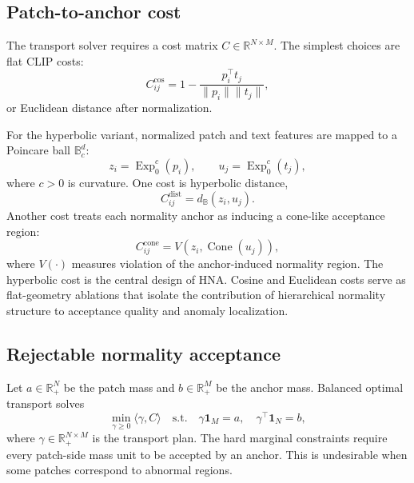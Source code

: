 \documentclass[10pt]{article}
\newcommand{\method}{HNA}
\begin{document}
\subsection{Patch-to-anchor cost}

The transport solver requires a cost matrix $C \in \mathbb{R}^{N \times M}$.
The simplest choices are flat CLIP costs:
\begin{equation}
    C_{ij}^{\mathrm{cos}} = 1 - \frac{p_i^{\top}t_j}{\|p_i\|\|t_j\|},
\end{equation}
or Euclidean distance after normalization.

For the hyperbolic variant, normalized patch and text features are mapped to a Poincare ball $\mathbb{B}^{d}_{c}$:
\begin{equation}
    z_i = \operatorname{Exp}^{c}_{0}(p_i), \qquad
    u_j = \operatorname{Exp}^{c}_{0}(t_j),
\end{equation}
where $c>0$ is curvature.
One cost is hyperbolic distance,
\begin{equation}
    C_{ij}^{\mathrm{dist}} = d_{\mathbb{B}}(z_i, u_j).
\end{equation}
Another cost treats each normality anchor as inducing a cone-like acceptance region:
\begin{equation}
    C_{ij}^{\mathrm{cone}} = V(z_i, \operatorname{Cone}(u_j)),
\end{equation}
where $V(\cdot)$ measures violation of the anchor-induced normality region.
The hyperbolic cost is the central design of \method{}.
Cosine and Euclidean costs serve as flat-geometry ablations that isolate the contribution of hierarchical normality structure to acceptance quality and anomaly localization.

\subsection{Rejectable normality acceptance}

Let $a \in \mathbb{R}_{+}^{N}$ be the patch mass and $b \in \mathbb{R}_{+}^{M}$ be the anchor mass.
Balanced optimal transport solves
\begin{equation}
    \min_{\gamma \geq 0} \langle \gamma, C \rangle
    \quad
    \mathrm{s.t.}\quad
    \gamma \mathbf{1}_{M}=a,\quad
    \gamma^{\top}\mathbf{1}_{N}=b,
\end{equation}
where $\gamma \in \mathbb{R}_{+}^{N \times M}$ is the transport plan.
The hard marginal constraints require every patch-side mass unit to be accepted by an anchor.
This is undesirable when some patches correspond to abnormal regions.
\end{document}
